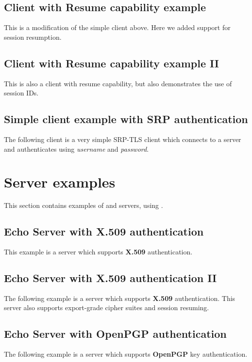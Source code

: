 \subsection{Client with Resume capability example}
\label{resume-example}
This is a modification of the simple client above. Here we added support 
for session resumption.


\subsection{Client with Resume capability example II}
\label{resume-example2}
This is also a client with resume capability, but also demonstrates
the use of session IDs.


\subsection{Simple client example with SRP authentication}
The following client
is a very simple SRP-TLS client which connects to a server 
and authenticates using {\it username} and {\it password}.



\section{Server examples}
This section contains examples of \tls{} and \ssl{} servers, using \gnutls{}.

\subsection{Echo Server with X.509 authentication}
This example is a server which supports {\bf X.509} authentication.


\subsection{Echo Server with X.509 authentication II}
The following example is a server which supports {\bf X.509} authentication.
This server also supports export-grade cipher suites and session resuming.


\subsection{Echo Server with OpenPGP authentication}
The following example is a server which supports {\bf OpenPGP} key authentication.


